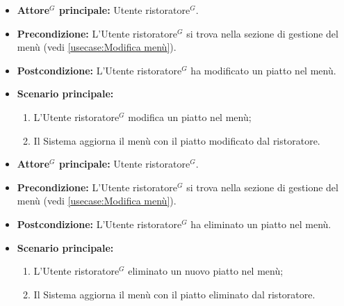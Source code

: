 \label{usecase:Modifica piatto}
\begin{itemize}

	\item \textbf{\gls{Attore}$^G$ principale:} \gls{Utente ristoratore}$^G$.

	\item \textbf{Precondizione:} L'\gls{Utente ristoratore}$^G$ si trova nella sezione di gestione del menù (vedi \autoref{usecase:Modifica menù}).

	\item \textbf{Postcondizione:} L'\gls{Utente ristoratore}$^G$ ha modificato un piatto nel menù.

	\item \textbf{Scenario principale:}
	\begin{enumerate}
		\item L'\gls{Utente ristoratore}$^G$ modifica un piatto nel menù;
		\item Il Sistema aggiorna il menù con il piatto modificato dal ristoratore.
	\end{enumerate}

\end{itemize}


\label{usecase:Eliminazione piatto}
\begin{itemize}

	\item \textbf{\gls{Attore}$^G$ principale:} \gls{Utente ristoratore}$^G$.

	\item \textbf{Precondizione:} L'\gls{Utente ristoratore}$^G$ si trova nella sezione di gestione del menù (vedi \autoref{usecase:Modifica menù}).

	\item \textbf{Postcondizione:} L'\gls{Utente ristoratore}$^G$ ha eliminato un piatto nel menù.

	\item \textbf{Scenario principale:}
	\begin{enumerate}
		\item L'\gls{Utente ristoratore}$^G$ eliminato un nuovo piatto nel menù;
		\item Il Sistema aggiorna il menù con il piatto eliminato dal ristoratore.
	\end{enumerate}

\end{itemize}
